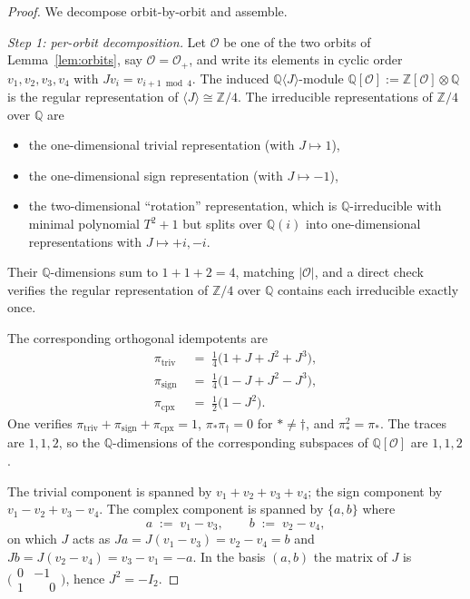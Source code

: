 \documentclass[11pt,reqno]{amsart}
\theoremstyle{plain}
\theoremstyle{definition}
\theoremstyle{remark}
\numberwithin{equation}{section}
\begin{document}
\begin{proof}
We decompose orbit-by-orbit and assemble.

\medskip

\textit{Step 1: per-orbit decomposition.}
Let $\mathcal{O}$ be one of the two orbits of
Lemma~\ref{lem:orbits}, say $\mathcal{O} = \mathcal{O}_{+}$, and
write its elements in cyclic order $v_1, v_2, v_3, v_4$ with
$J v_{i} = v_{i+1 \!\bmod 4}$. The induced $\mathbb{Q}\langle J
\rangle$-module $\mathbb{Q}[\mathcal{O}] := \mathbb{Z}[\mathcal{O}]
\otimes \mathbb{Q}$ is the regular representation of
$\langle J \rangle \cong \mathbb{Z}/4$. The irreducible
representations of $\mathbb{Z}/4$ over $\mathbb{Q}$ are
\begin{itemize}[leftmargin=*]
\item the one-dimensional trivial representation (with $J \mapsto 1$),
\item the one-dimensional sign representation (with $J \mapsto -1$),
\item the two-dimensional ``rotation'' representation, which is
$\mathbb{Q}$-irreducible with minimal polynomial $T^{2} + 1$ but
splits over $\mathbb{Q}(i)$ into one-dimensional representations
with $J \mapsto +i, -i$.
\end{itemize}
Their $\mathbb{Q}$-dimensions sum to $1 + 1 + 2 = 4$, matching
$|\mathcal{O}|$, and a direct check verifies the regular
representation of $\mathbb{Z}/4$ over $\mathbb{Q}$ contains each
irreducible exactly once.

The corresponding orthogonal idempotents are
\begin{align*}
  \pi_{\mathrm{triv}} \;&=\; \tfrac{1}{4}\bigl(1 + J + J^{2} + J^{3}\bigr), \\
  \pi_{\mathrm{sign}} \;&=\; \tfrac{1}{4}\bigl(1 - J + J^{2} - J^{3}\bigr), \\
  \pi_{\mathrm{cpx}}  \;&=\; \tfrac{1}{2}\bigl(1 - J^{2}\bigr).
\end{align*}
One verifies $\pi_{\mathrm{triv}} + \pi_{\mathrm{sign}} +
\pi_{\mathrm{cpx}} = 1$, $\pi_{*} \pi_{\dagger} = 0$ for $* \neq
\dagger$, and $\pi_{*}^{2} = \pi_{*}$. The traces are $1, 1, 2$, so
the $\mathbb{Q}$-dimensions of the corresponding subspaces of
$\mathbb{Q}[\mathcal{O}]$ are $1, 1, 2$.

The trivial component is spanned by $v_{1} + v_{2} + v_{3} + v_{4}$;
the sign component by $v_{1} - v_{2} + v_{3} - v_{4}$. The complex
component is spanned by $\{a, b\}$ where
\[
  a \;:=\; v_{1} - v_{3}, \qquad b \;:=\; v_{2} - v_{4},
\]
on which $J$ acts as $J a = J(v_{1} - v_{3}) = v_{2} - v_{4} = b$
and $J b = J(v_{2} - v_{4}) = v_{3} - v_{1} = -a$. In the basis
$(a, b)$ the matrix of $J$ is
$\bigl(\begin{smallmatrix} 0 & -1 \\ 1 & \phantom{-}0 \end{smallmatrix}\bigr)$,
hence $J^{2} = -I_{2}$.


\end{proof}
\end{document}

